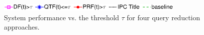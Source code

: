 %
%
\begin{figure}[t!]
\begin{centering}
\includegraphics[width=9cm]{imgs/l2.eps}
\vspace*{-4ex}
\par\end{centering}
\begin{centering}
\par\end{centering}
\vspace*{-3ex}
\protect\caption{System performance vs. the threshold $\tau$ for four query reduction approaches.}
\label{fig:queryreduc}
\end{figure}
